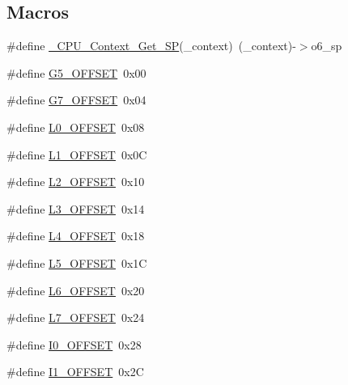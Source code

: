 \subsection*{Macros}
\begin{DoxyCompactItemize}
\item 
\#define \mbox{\hyperlink{group__RTEMSScoreCPUSPARCContext_ga896055157b72692a6141f7c0039eabdf}{\+\_\+\+C\+P\+U\+\_\+\+Context\+\_\+\+Get\+\_\+\+SP}}(\+\_\+context)~(\+\_\+context)-\/$>$o6\+\_\+sp
\item 
\#define \mbox{\hyperlink{group__RTEMSScoreCPUSPARCContext_gaacf8d8cd4c57d17ca53d43081656bfbe}{G5\+\_\+\+O\+F\+F\+S\+ET}}~0x00
\item 
\#define \mbox{\hyperlink{group__RTEMSScoreCPUSPARCContext_ga9cf33dbd23363f125419f6fbf4f1ea28}{G7\+\_\+\+O\+F\+F\+S\+ET}}~0x04
\item 
\#define \mbox{\hyperlink{group__RTEMSScoreCPUSPARCContext_ga2aa8381a55d2c725ac07d78ede350ea8}{L0\+\_\+\+O\+F\+F\+S\+ET}}~0x08
\item 
\#define \mbox{\hyperlink{group__RTEMSScoreCPUSPARCContext_ga7e0044af98788804b7e01283a931753a}{L1\+\_\+\+O\+F\+F\+S\+ET}}~0x0C
\item 
\#define \mbox{\hyperlink{group__RTEMSScoreCPUSPARCContext_ga7fdcfc866446c76c90a964133b733c65}{L2\+\_\+\+O\+F\+F\+S\+ET}}~0x10
\item 
\#define \mbox{\hyperlink{group__RTEMSScoreCPUSPARCContext_ga001d65789e1ed126aa2084f4bb1dd7f2}{L3\+\_\+\+O\+F\+F\+S\+ET}}~0x14
\item 
\#define \mbox{\hyperlink{group__RTEMSScoreCPUSPARCContext_gab8ac89039868966d5931b1053cf5f8e5}{L4\+\_\+\+O\+F\+F\+S\+ET}}~0x18
\item 
\#define \mbox{\hyperlink{group__RTEMSScoreCPUSPARCContext_gab727930f92faa1ede90a2becdfb5a5ce}{L5\+\_\+\+O\+F\+F\+S\+ET}}~0x1C
\item 
\#define \mbox{\hyperlink{group__RTEMSScoreCPUSPARCContext_ga0f28989f9c9df5f4e9300b6e8fa7a46d}{L6\+\_\+\+O\+F\+F\+S\+ET}}~0x20
\item 
\#define \mbox{\hyperlink{group__RTEMSScoreCPUSPARCContext_ga9ed383ce2f38f0aea53914620608700f}{L7\+\_\+\+O\+F\+F\+S\+ET}}~0x24
\item 
\#define \mbox{\hyperlink{group__RTEMSScoreCPUSPARCContext_gab7e98875dfbe6ad4b8130e5acf103d64}{I0\+\_\+\+O\+F\+F\+S\+ET}}~0x28
\item 
\#define \mbox{\hyperlink{group__RTEMSScoreCPUSPARCContext_gabc8b2a000280c14e700f2b6149a270cd}{I1\+\_\+\+O\+F\+F\+S\+ET}}~0x2C
\item 

\end{DoxyCompactItemize}
